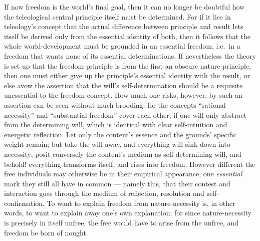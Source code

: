 \documentclass[12pt]{book}
\begin{document}
If now freedom is the world's final goal, then it can no longer be doubtful
how the teleological central principle itself must be determined. For if it
lies in teleology's concept that the actual difference between principle and
result lets itself be derived only from the essential identity of both, then
it follows that the whole world-development must be grounded in an essential
freedom, i.e.\ in a freedom that wants none of its essential
determinations. If nevertheless the theory is set up that the
freedom-principle is from the first an obscure nature-principle, then one
must either give up the principle's essential identity with the result, or
else avow the assertion that the will's self-determination should be a
requisite unessential to the freedom-concept. How much one risks, however,
by such an assertion can be seen without much brooding; for the concepts
``rational necessity'' and ``substantial freedom'' cover each other, if one
will only abstract from the determining will, which is identical with clear
self-intuition and energetic reflection. Let only the content's essence and
the grounds' specific weight remain; but take the will away, and everything
will sink down into necessity; posit conversely the content's medium as
self-determining will, and behold! everything transforms itself, and rises
into freedom. However different the free individuals may otherwise be in
their empirical appearance, one \emph{essential} mark they still all have in
common --- namely this, that their contest and interaction goes through the
medium of reflection, resolution and self-confirmation. To want to explain
freedom from nature-necessity is, in other words, to want to explain away
one's own explanation; for since nature-necessity is precisely in itself
unfree, the free would have to arise from the unfree, and freedom be born of
nought.
\end{document}
